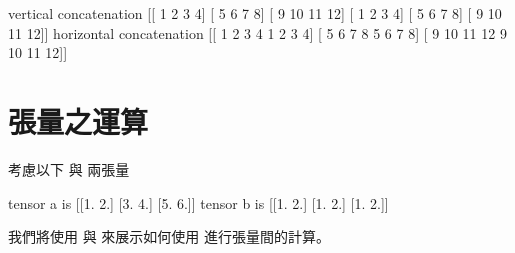 \documentclass[letterpaper,10pt,english]{sphinxmanual}
\begin{document}
\begin{sphinxVerbatim}[commandchars=\\\{\}]
vertical concatenation 
 [[ 1  2  3  4]
 [ 5  6  7  8]
 [ 9 10 11 12]
 [ 1  2  3  4]
 [ 5  6  7  8]
 [ 9 10 11 12]]
horizontal concatenation 
 [[ 1  2  3  4  1  2  3  4]
 [ 5  6  7  8  5  6  7  8]
 [ 9 10 11 12  9 10 11 12]]
\end{sphinxVerbatim}


\section{張量之運算}
\label{\detokenize{notebook/lab-torch-tensor:id9}}
考慮以下  與  兩張量

\begin{sphinxVerbatim}[commandchars=\\\{\}]
    \PYG{p}{[}\PYG{p}{[} \PYG{p}{]} \PYG{p}{[} \PYG{p}{]} \PYG{p}{[} \PYG{p}{]}\PYG{p}{]}
                  
    \PYG{p}{[}\PYG{p}{[} \PYG{p}{]} \PYG{p}{[} \PYG{p}{]} \PYG{p}{[} \PYG{p}{]}\PYG{p}{]}
                  
 
 
\end{sphinxVerbatim}

\begin{sphinxVerbatim}[commandchars=\\\{\}]
tensor a is 
 [[1. 2.]
 [3. 4.]
 [5. 6.]]
tensor b is 
 [[1. 2.]
 [1. 2.]
 [1. 2.]]
\end{sphinxVerbatim}

我們將使用  與  來展示如何使用  進行張量間的計算。
\end{document}
